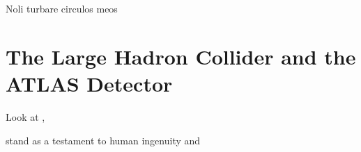 \begin{savequote}[75mm]
Noli turbare circulos meos
\end{savequote}

\chapter{The Large Hadron Collider and the ATLAS Detector}
Look at \cite{jinstpaper}, \cite{run1note}

 stand as a testament to human ingenuity and

